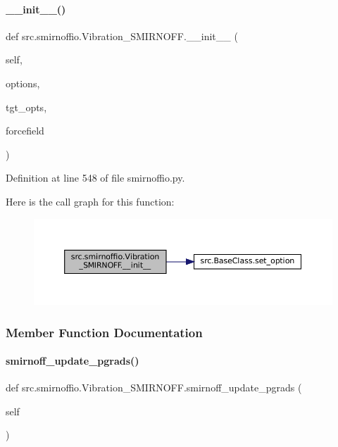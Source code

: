 \paragraph{\texorpdfstring{\+\_\+\+\_\+init\+\_\+\+\_\+()}{\_\_init\_\_()}}
{\footnotesize\ttfamily def src.\+smirnoffio.\+Vibration\+\_\+\+S\+M\+I\+R\+N\+O\+F\+F.\+\_\+\+\_\+init\+\_\+\+\_\+ (\begin{DoxyParamCaption}\item[{}]{self,  }\item[{}]{options,  }\item[{}]{tgt\+\_\+opts,  }\item[{}]{forcefield }\end{DoxyParamCaption})}



Definition at line 548 of file smirnoffio.\+py.

Here is the call graph for this function\+:
\nopagebreak
\begin{figure}[H]
\begin{center}
\leavevmode
\includegraphics[width=350pt]{classsrc_1_1smirnoffio_1_1Vibration__SMIRNOFF_a8c258f46d442919b9d70ce89c8139271_cgraph}
\end{center}
\end{figure}


\subsubsection{Member Function Documentation}
\mbox{\label{classsrc_1_1smirnoffio_1_1Vibration__SMIRNOFF_a210c06bf1e21c3c93e584eef9256ef0c}} 
\paragraph{\texorpdfstring{smirnoff\+\_\+update\+\_\+pgrads()}{smirnoff\_update\_pgrads()}}
{\footnotesize\ttfamily def src.\+smirnoffio.\+Vibration\+\_\+\+S\+M\+I\+R\+N\+O\+F\+F.\+smirnoff\+\_\+update\+\_\+pgrads (\begin{DoxyParamCaption}\item[{}]{self }\end{DoxyParamCaption})}



